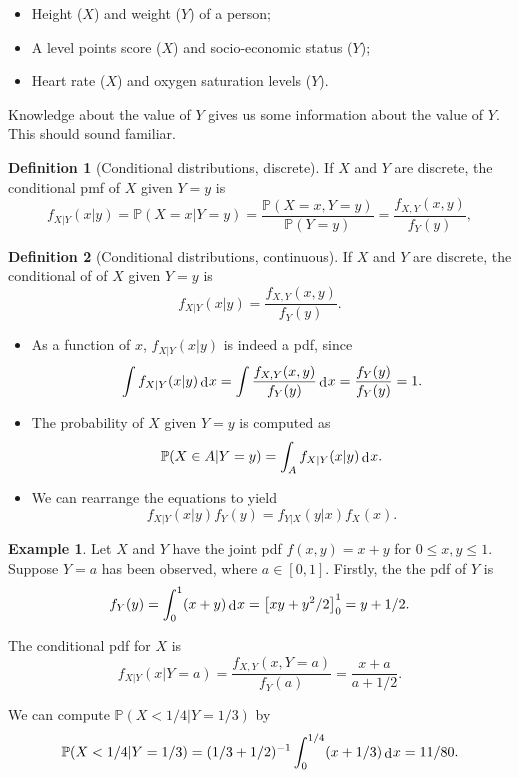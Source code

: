 \documentclass[
]{book}
\providecommand{\tightlist}{%
  \setlength{\itemsep}{0pt}\setlength{\parskip}{0pt}}
\newcommand{\bbP}{\mathbb{P}}
\DeclareMathOperator{\dd}{d}
\newcommand{\dint}{\dd\hspace{0.5pt}\!}
\theoremstyle{definition}
\newtheorem{definition}{Definition}[chapter]
\theoremstyle{definition}
\newtheorem{example}{Example}[chapter]
\theoremstyle{definition}
\theoremstyle{definition}
\theoremstyle{remark}
\begin{document}
\begin{itemize}
\tightlist
\item
  Height (\(X\)) and weight (\(Y\)) of a person;
\item
  A level points score (\(X\)) and socio-economic status (\(Y\));
\item
  Heart rate (\(X\)) and oxygen saturation levels (\(Y\)).
\end{itemize}

Knowledge about the value of \(Y\) gives us some information about the value of \(Y\). This should sound familiar.

\begin{definition}[Conditional distributions, discrete]
If \(X\) and \(Y\) are discrete, the conditional pmf of \(X\) given \(Y=y\) is
\[
  f_{X|Y}(x|y) = \bbP(X=x|Y=y) = \frac{\bbP(X=x, Y=y)}{\bbP(Y=y)} = \frac{f_{X,Y}(x, y)}{f_Y(y)},
\]
\end{definition}

\begin{definition}[Conditional distributions, continuous]
If \(X\) and \(Y\) are discrete, the conditional of of \(X\) given \(Y=y\) is
\[
  f_{X|Y}(x|y) =  \frac{f_{X,Y}(x, y)}{f_Y(y)}.
\]
\end{definition}

\begin{itemize}
\tightlist
\item
  As a function of \(x\), \(f_{X|Y}(x|y)\) is indeed a pdf, since
  \[
  \int f_{X|Y}(x|y) \dint x = \int \frac{f_{X,Y}(x, y)}{f_Y(y)} \dint x = \frac{f_Y(y)}{f_Y(y)} = 1.
  \]
\item
  The probability of \(X\) given \(Y=y\) is computed as
  \[
  \bbP(X \in A|Y=y) = \int_A f_{X|Y}(x|y) \dint x. 
  \]
\item
  We can rearrange the equations to yield \[f_{X|Y}(x|y)f_Y(y)=f_{Y|X}(y|x)f_X(x).\]
\end{itemize}

\begin{example}
Let \(X\) and \(Y\) have the joint pdf \(f(x,y)=x+y\) for \(0\leq x,y\leq 1\).
Suppose \(Y=a\) has been observed, where \(a\in[0,1]\).
Firstly, the the pdf of \(Y\) is
\[
f_Y(y) = \int_0^1 (x+y) \dint x = \left[xy +y^2/2\right]_0^1 = y + 1/2.
\]

The conditional pdf for \(X\) is
\[
f_{X|Y}(x|Y=a) = \frac{f_{X,Y}(x,Y=a)}{f_Y(a)} = \frac{x+a}{a + 1/2}.
\]

We can compute \(\bbP(X<1/4|Y=1/3)\) by
\begin{align*}
\bbP(X<1/4|Y=1/3) = (1/3 + 1/2)^{-1} \int_{0}^{1/4} (x+1/3) \dint x = 11/80.
\end{align*}
\end{example}
\end{document}
